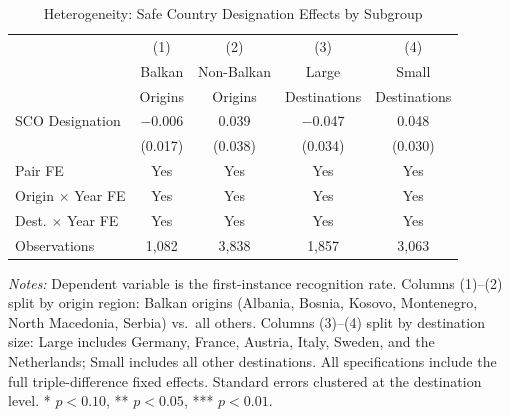 \begin{table}[H]
\centering
\caption{Heterogeneity: Safe Country Designation Effects by Subgroup}
\begin{threeparttable}
\begin{tabular}{lcccc}
\toprule
 & (1) & (2) & (3) & (4) \\
 & Balkan & Non-Balkan & Large & Small \\
 & Origins & Origins & Destinations & Destinations \\
\midrule
SCO Designation & $-$0.006 & 0.039 & $-$0.047 & 0.048 \\
 & (0.017) & (0.038) & (0.034) & (0.030) \\[0.5em]
\midrule
Pair FE & Yes & Yes & Yes & Yes \\
Origin $\times$ Year FE & Yes & Yes & Yes & Yes \\
Dest. $\times$ Year FE & Yes & Yes & Yes & Yes \\[0.3em]
Observations & 1,082 & 3,838 & 1,857 & 3,063 \\
\bottomrule
\end{tabular}
\begin{tablenotes}[flushleft]
\small
\item \textit{Notes:} Dependent variable is the first-instance recognition rate. Columns (1)--(2) split by origin region: Balkan origins (Albania, Bosnia, Kosovo, Montenegro, North Macedonia, Serbia) vs.\ all others. Columns (3)--(4) split by destination size: Large includes Germany, France, Austria, Italy, Sweden, and the Netherlands; Small includes all other destinations. All specifications include the full triple-difference fixed effects. Standard errors clustered at the destination level. * $p<0.10$, ** $p<0.05$, *** $p<0.01$.
\end{tablenotes}
\end{threeparttable}
\label{tab:hetero}
\end{table}
